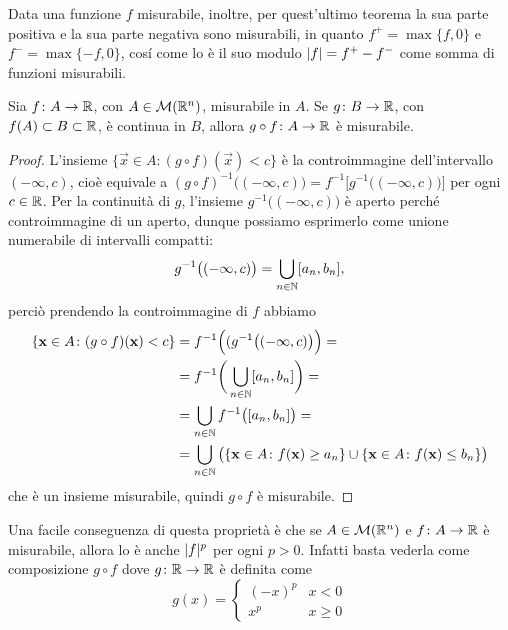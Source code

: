 Data una funzione $f$ misurabile, inoltre, per quest'ultimo teorema la sua parte positiva e la sua parte negativa sono misurabili, in quanto $f^+=\max\{f,0\}$ e $f^-=\max\{-f,0\}$, cos\'i come lo è il suo modulo $\lvert f\rvert=f^+-f^-$ come somma di funzioni misurabili.
\begin{proprieta} \label{pr:composizione-funzioni-misurabili}
	Sia $f\colon A\to\mathbb{R}$, con $A\in\mathcal M(\mathbb{R}^n)$, misurabile in $A$.
	Se $g\colon B\to\mathbb{R}$, con $f(A)\subset B\subset\mathbb{R}$, è continua in $B$, allora $g\circ f\colon A\to\mathbb{R}$ è misurabile.
\end{proprieta}
\begin{proof}
	L'insieme $\{\vec x\in A\colon (g\circ f)(\vec x)<c\}$ è la controimmagine dell'intervallo $(-\infty,c)$, cioè equivale a $(g\circ f)^{-1}\big( (-\infty,c)\big)=f^{-1}\big[g^{-1}\big((-\infty,c)\big)\big]$ per ogni $c\in\mathbb{R}$.
	Per la continuità di $g$, l'insieme $g^{-1}\big( (-\infty,c)\big)$ è aperto perch\'e controimmagine di un aperto, dunque possiamo esprimerlo come unione numerabile di intervalli compatti:
	\begin{equation}
		g^{-1}\big( (-\infty,c)\big)=\bigcup_{n\in\mathbb{N}}[a_n,b_n],
	\end{equation}
	perciò prendendo la controimmagine di $f$ abbiamo
	\begin{equation}
		\begin{split}
			\{\mathbf{x}\in A\colon (g\circ f)(\mathbf{x})<c\}&=f^{-1}\Big((g^{-1}\big( (-\infty,c)\big)\Big)=\\
			&=f^{-1}\bigg(\bigcup_{n\in\mathbb{N}}[a_n,b_n]\bigg)=\\
			&=\bigcup_{n\in\mathbb{N}}f^{-1}\big([a_n,b_n]\big)=\\
			&=\bigcup_{n\in\mathbb{N}}\big(\{\mathbf{x}\in A\colon f(\mathbf{x})\geq a_n\}\cup\{\mathbf{x}\in A\colon f(\mathbf{x})\leq b_n\}\big)
		\end{split}
	\end{equation}
	che è un insieme misurabile, quindi $g\circ f$ è misurabile.
\end{proof}
Una facile conseguenza di questa proprietà è che se $A\in\mathcal M(\mathbb{R}^n)$ e $f\colon A\to\mathbb{R}$ è misurabile, allora lo è anche $\lvert f\rvert^p$ per ogni $p>0$.
Infatti basta vederla come composizione $g\circ f$ dove $g\colon\mathbb{R}\to\mathbb{R}$ è definita come
\begin{equation}
	g(x)=
	\begin{cases}
		(-x)^p & x<0\\
		x^p    & x\ge 0
	\end{cases}
\end{equation}
